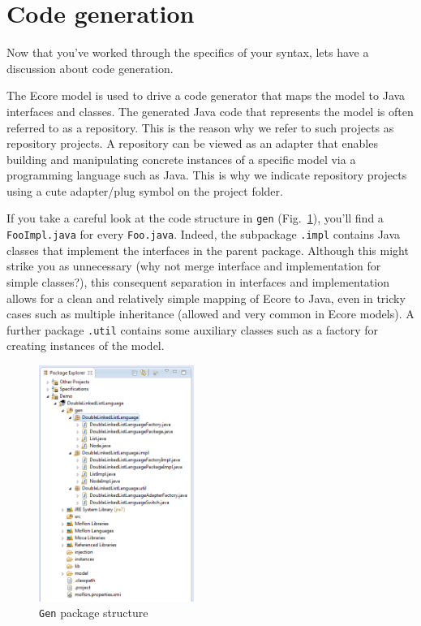 \newpage
\genHeader

\section{Code generation}

Now\hypertarget{codeGen common}{} that you've worked through the specifics of your syntax, lets have a discussion about code generation.

The Ecore model is used to drive a code generator that maps the model to Java interfaces and classes.
The generated Java code that represents the model is often referred to as a repository. This is the reason why we refer to such projects as repository projects.
A repository can be viewed as an adapter that enables building and manipulating concrete instances of a specific model via a programming language such as Java.
This is why we indicate repository projects using a cute adapter/plug symbol on the project folder.


If you take a careful look at the code structure in \texttt{gen} (Fig.~\ref{fig_structureGen}), you'll find a \texttt{FooImpl.java} for every \texttt{Foo.java}.
Indeed, the subpackage \texttt{.impl} contains Java classes that implement the interfaces in the parent package. Although this might strike you as unnecessary
(why not merge interface and implementation for simple classes?), this consequent separation in interfaces and implementation allows for a clean and relatively
simple mapping of Ecore to Java, even in tricky cases such as multiple inheritance (allowed and very common in Ecore models).
A further package \texttt{.util} contains some auxiliary classes such as a factory for creating instances of the model.

 \begin{figure}[htbp]
  \centering
  \includegraphics[width=0.45\textwidth]{eclipse_structureGen}
  \caption{\texttt{Gen} package structure}
  \label{fig_structureGen}
\end{figure}

